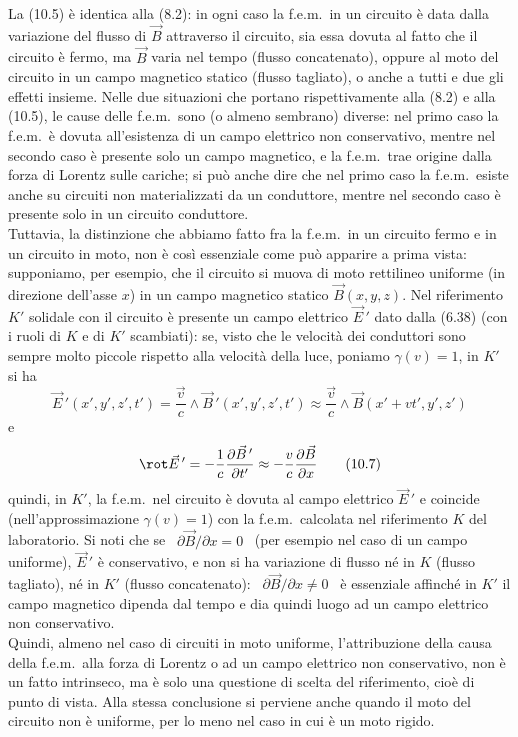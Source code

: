 La (10.5) \`e identica alla (8.2): in ogni caso la f.e.m.\ in un circuito \`e
data dalla variazione del flusso di $\vec B$ attraverso il circuito, sia essa
dovuta al fatto che il circuito \`e fermo, ma $\vec B$ varia nel tempo (flusso
concatenato), oppure al moto del circuito in un campo magnetico statico (flusso
tagliato), o anche a tutti e due gli effetti insieme. Nelle due situazioni che
portano rispettivamente alla (8.2) e alla (10.5), le cause delle f.e.m.\ sono (o
almeno sembrano) diverse: nel primo caso la f.e.m.\ \`e dovuta all'esistenza di
un campo elettrico non conservativo, mentre nel secondo caso \`e presente solo
un campo magnetico, e la f.e.m.\ trae origine dalla forza di Lorentz sulle
cariche; si pu\`o anche dire che nel primo caso la f.e.m.\ esiste anche su
circuiti non materializzati da un conduttore, mentre nel secondo caso \`e
presente solo in un circuito conduttore.\\
Tuttavia, la distinzione che abbiamo fatto fra la f.e.m.\ in un circuito fermo e
in un circuito in moto, non \`e cos\`i essenziale come pu\`o apparire a prima
vista: supponiamo, per esempio, che il circuito si muova di moto rettilineo
uniforme (in direzione dell'asse $x$) in un campo magnetico statico
$\vec B(x,y,z)$. Nel riferimento $K'$ solidale con il circuito \`e presente un
campo elettrico $\vec E\,'$ dato dalla (6.38) (con i ruoli di $K$ e di $K'$
scambiati): se, visto che le velocit\`a dei conduttori sono sempre molto piccole
rispetto alla velocit\`a della luce, poniamo $\gamma(v)=1$, in $K'$ si ha
\begin{equation}
  \vec E\,'(x',y',z',t')=\frac{\vec v}{c}\wedge\vec B\,'(x',y',z',t')
  \approx\frac{\vec v}{c}\wedge\vec B(x'+vt',y',z')
  \tag{10.6}
\end{equation}
e
\begin{equation}
  \rot\vec E\,'=-\frac{1}{c}\frac{\partial\vec B\,'}{\partial t'}
  \approx-\frac{v}{c}\frac{\partial\vec B}{\partial x}
  \tag{10.7}
\end{equation}
quindi, in $K'$, la f.e.m.\ nel circuito \`e dovuta al campo elettrico
$\vec E\,'$ e coincide (nell'approssimazione $\gamma(v)=1$) con la
f.e.m.\ calcolata nel riferimento $K$ del laboratorio. Si noti che se
\ $\partial\vec B/\partial x=0$ \ (per esempio nel caso di un campo uniforme),
$\vec E\,'$ \`e conservativo, e non si ha variazione di flusso n\'e in $K$
(flusso tagliato), n\'e in $K'$ (flusso concatenato):
\ $\partial\vec B/\partial x\ne0$ \ \`e essenziale affinch\'e in $K'$ il campo
magnetico dipenda dal tempo e dia quindi luogo ad un campo elettrico non
conservativo.\\
Quindi, almeno nel caso di circuiti in moto uniforme, l'attribuzione della causa
della f.e.m.\ alla forza di Lorentz o ad un campo elettrico non conservativo,
non \`e un fatto intrinseco, ma \`e solo una questione di scelta del
riferimento, cio\`e di punto di vista. Alla stessa conclusione si perviene anche
quando il moto del circuito non \`e uniforme, per lo meno nel caso in cui \`e un
moto rigido.

